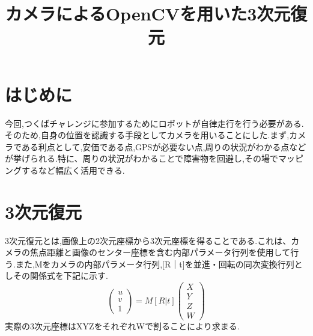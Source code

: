 \documentclass[a4paper]{jarticle}
\begin{document}
\title{カメラによるOpenCVを用いた3次元復元}


\maketitle

\section{はじめに}
今回,つくばチャレンジに参加するためにロボットが自律走行を行う必要がある.そのため,自身の位置を認識する手段としてカメラを用いることにした.まず,カメラである利点として,安価である点,GPSが必要ない点,周りの状況がわかる点などが挙げられる.特に、周りの状況がわかることで障害物を回避し,その場でマッピングするなど幅広く活用できる.



\section{3次元復元}
3次元復元とは,画像上の2次元座標から3次元座標を得ることである.これは、カメラの焦点距離と画像のセンター座標を含む内部パラメータ行列を使用して行う.また,Mをカメラの内部パラメータ行列,[R｜t]を並進・回転の同次変換行列としその関係式を下記に示す.
\begin{equation}
\left(
    \begin{array}{c}
      u \\
      v \\
      1 
    \end{array}
  \right)=M[R|t]\left(
    \begin{array}{c}
      X \\
      Y \\
      Z \\
      W
    \end{array}
  \right)
\end{equation}
実際の3次元座標はXYZをそれぞれWで割ることにより求まる.
\end{document}
